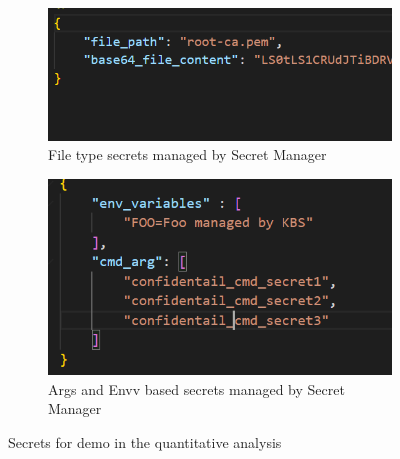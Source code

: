\begin{figure}[!htb] 
    \begin{subfigure}[b]{0.45\linewidth}
      \centering
      \includegraphics[width=0.9\linewidth]{images/file_secrets.PNG} 
      \caption{File type secrets managed by Secret Manager} 
      \label{fig:file_secrets} 
      \vspace{4ex}
    \end{subfigure}%
    \begin{subfigure}[b]{0.45\linewidth}
      \centering
      \includegraphics[width=0.9\linewidth]{images/cmd_env_secrets.png} 
      \caption{Args and Envv based secrets managed by Secret Manager} 
      \label{fig:cmd_env_secrets} 
      \vspace{4ex}
    \end{subfigure} 
    \caption{Secrets for demo in the quantitative analysis}
    \label{fig5} 
\end{figure}


